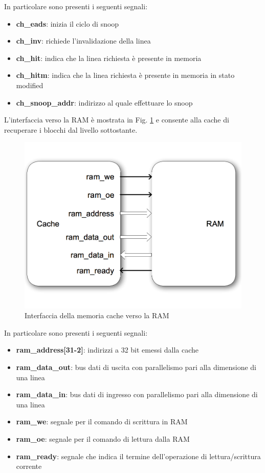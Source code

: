 In particolare sono presenti i seguenti segnali:
\begin{itemize}
\item \textbf{ch\_eads}: inizia il ciclo di snoop
\item \textbf{ch\_inv}: richiede l'invalidazione della linea
\item \textbf{ch\_hit}: indica che la linea richiesta \`e presente in memoria
\item \textbf{ch\_hitm}: indica che la linea richiesta \`e presente in memoria in stato modified
\item \textbf{ch\_snoop\_addr}: indirizzo al quale effettuare lo snoop
\end{itemize}


L'interfaccia verso la RAM \`e mostrata in Fig. \ref{fig:int_ram} e consente alla cache di recuperare i blocchi dal livello sottostante.\\

\begin{figure}[h!]
\centering
\includegraphics[width=\textwidth]{img/cache/ram.png}
\caption{Interfaccia della memoria cache verso la RAM}
\label{fig:int_ram}
\end{figure}

In particolare sono presenti i seguenti segnali:
\begin{itemize} %
\item \textbf{ram\_address[31-2]}: indirizzi a 32 bit emessi dalla cache
\item \textbf{ram\_data\_out}: bus dati di uscita con parallelismo pari alla dimensione di una linea
\item \textbf{ram\_data\_in}: bus dati di ingresso con parallelismo pari alla dimensione di una linea
\item \textbf{ram\_we}: segnale per il comando di scrittura in RAM
\item \textbf{ram\_oe}: segnale per il comando di lettura dalla RAM
\item \textbf{ram\_ready}: segnale che indica il termine dell'operazione di lettura/scrittura corrente
\end{itemize}

